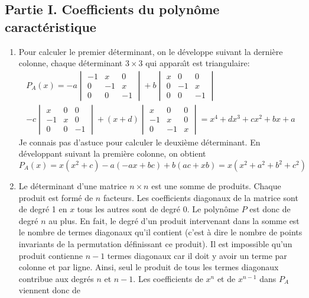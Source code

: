 \subsection*{Partie I. Coefficients du polyn{\^o}me caract{\'e}ristique}
\begin{enumerate}
\item Pour calculer le premier d{\'e}terminant, on le d{\'e}veloppe suivant la derni{\`e}re colonne, chaque d{\'e}terminant $3\times3$ qui appara{\^\i}t est triangulaire:
  \begin{multline*}
P_A(x)
= -a 
\begin{vmatrix}
-1 & x  & 0 \\
0 & -1  & x \\
0 & 0  & -1
\end{vmatrix}
+b\begin{vmatrix}
x & 0  & 0 \\
0 & -1 & x \\
0 & 0 & -1
\end{vmatrix}\\
-c\begin{vmatrix}
x & 0 & 0\\
-1 & x & 0\\
0 & 0 & -1
\end{vmatrix}
+(x+d)\begin{vmatrix}
x & 0 & 0\\
-1 & x & 0\\
0 & -1 & x
\end{vmatrix}
= x^4+dx^3+cx^2+bx+a
\end{multline*}
Je connais pas d'astuce pour calculer le deuxi{\`e}me d{\'e}terminant. En d{\'e}veloppant suivant la premi{\`e}re colonne, on obtient
\[P_A(x)=x(x^2+c)-a(-ax+bc)+b(ac+xb)=x(x^2+a^2+b^2+c^2)\]
\item Le d{\'e}terminant d'une matrice $n\times n$ est une somme de produits. Chaque produit est form{\'e} de $n$ facteurs. Les coefficients
  diagonaux de la matrice sont de degr{\'e} 1 en $x$ tous les autres sont  de degr{\'e} 0. Le polyn{\^o}me $P$ est donc de degr{\'e} $n$ au plus. En fait,  le degr{\'e} d'un produit intervenant dans la somme est le nombre de  termes diagonaux qu'il contient (c'est à dire le nombre de points invariants de la permutation définissant ce produit). Il est impossible qu'un produit  contienne $n-1$ termes diagonaux car il doit y avoir un terme par colonne et par ligne. Ainsi, seul le produit de tous les termes diagonaux contribue aux degr{\'e}s $n$ et $n-1$. Les coefficients de $x^n$ et de $x^{n-1}$ dans $P_A$ viennent donc de

\end{enumerate}
